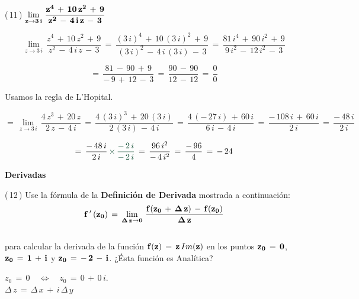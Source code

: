 \documentclass[a4paper,11pt,openany]{book}
\begin{document}
\textcolor{ao(english)}{(\,11\,)} $\bf{\displaystyle\lim_{z \to 3\,i}\,\dfrac{z^{4}\,+\,10\,z^{2}\,+\,9}{z^{2}\,-\,4\,i\,z\,-\,3}}$

$$\displaystyle\lim_{z \to 3\,i}\,\dfrac{z^{4}\,+\,10\,z^{2}\,+\,9}{z^{2}\,-\,4\,i\,z\,-\,3}\,=\,\dfrac{(3\,i)^{4}\,+\,10\,(3\,i)^{2}\,+\,9}{(3\,i)^{2}\,-\,4\,i\,(3\,i)\,-\,3}\,=\,\dfrac{81\,i^{4}\,+\,90\,i^{2}\,+\,9}{9\,i^{2}\,-\,12\,i^{2}\,-\,3}$$

$$=\,\dfrac{81\,-\,90\,+\,9}{-\,9\,+\,12\,-\,3}\,=\,\dfrac{90\,-\,90}{12\,-\,12}\,=\,\dfrac{0}{0}$$

\textcolor{ao(english)}{} Usamos la regla de L'Hopital.


$$=\,\displaystyle\lim_{z \to 3\,i}\,\dfrac{4\,z^{3}\,+\,20\,z}{2\,z\,-\,4\,i}\,=\,\dfrac{4\,(3\,i)^{3}\,+\,20\,(3\,i)}{2\,(3\,i)\,-\,4\,i}\,=\,\dfrac{4\,(-\,27\,i)\,+\,60\,i}{6\,i\,-\,4\,i}\,=\,\dfrac{-\,108\,i\,+\,60\,i}{2\,i}\,=\,\dfrac{-\,48\,i}{2\,i}$$

$$=\,\dfrac{-\,48\,i}{2\,i}\,\textcolor{britishracinggreen}{\times\,\dfrac{-\,2\,i}{-\,2\,i}}\,=\,\dfrac{96\,i^{2}}{-\,4\,i^{2}}\,=\,\dfrac{-\,96}{4}\,=\,-\,24$$

\begin{center}
\textbf{Derivadas}
\end{center}

\textcolor{ao(english)}{(\,12\,)} Use la fórmula de la \textbf{Definición de Derivada} mostrada a continuación:\\

$$\bf{f\,'\,(z_{0})\,=\,\displaystyle\lim_{\Delta\,z \to 0}\,\dfrac{f(z_{0}\,+\,\Delta\,z)\,-\,f(z_{0})}{\Delta\,z}}$$\\

para calcular la derivada de la función $\bf{f(z)\,=\,z\,\mathnormal{Im}(z)}$ en los puntos $\bf{z_{0}\,=\,0}$, $\bf{z_{0}\,=\,1\,+\,i}$ y $\bf{z_{0}\,=\,-\,2\,-\,i}$. ¿Ésta función es Analítica?\\

\begin{tcolorbox}[colback=ao(english)!5!white,colframe=ao(english)!75!black,fonttitle=\bfseries,title=\sf Recordemos que:]

\textcolor{ao(english)}{} $z_{0}\,=\,0 \quad\iff\quad z_{0}\,=\,0\,+\,0\,i$.\\

\textcolor{ao(english)}{} $\Delta\,z\,=\,\Delta\,x\,+\,i\,\Delta\,y$

\end{tcolorbox}
\end{document}
